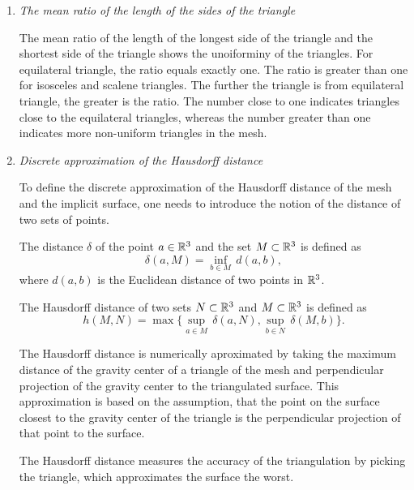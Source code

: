 \begin{enumerate}
    \item \textit{The mean ratio of the length of the sides of the triangle}
    
    The mean ratio of the length of the longest side of the triangle
    and the shortest side of the triangle shows the unoiforminy of the 
    triangles. 
    For equilateral triangle, the ratio equals exactly one. The ratio is
    greater than one for isosceles and scalene triangles. 
    The further the triangle is from equilateral triangle, the greater is the ratio.
    The number close to one indicates triangles close to the equilateral triangles,
    whereas the number greater than one indicates more non-uniform triangles in the mesh.

    \item \textit{Discrete approximation of the Hausdorff distance}
    
    To define the discrete approximation of the Hausdorff distance of the mesh and
    the implicit surface, one needs to introduce the notion of the distance of two sets
    of points.
\begin{definition} The distance $\delta$ of the point $a\in \mathbb{R}^3$ and the set
    $M \subset \mathbb{R}^3$ is defined as 
    \begin{equation}
        \delta(a, M) = \inf_{b \in M} \, d(a, b),
    \end{equation}
    where $d(a, b)$ is the Euclidean distance of two points in $\mathbb{R}^3$. 
\end{definition}
\begin{definition} The Hausdorff distance of two sets $N \subset \mathbb{R}^3$ and
    $M \subset \mathbb{R}^3$ is defined as
    \begin{equation}
        h(M, N) = \max \big \{\sup_{a \in M} \, \delta(a, N), \sup_{b \in N} \, \delta(M, b) \big \}.
    \end{equation}
\end{definition}
    The Hausdorff distance is numerically aproximated by taking the maximum distance
    of the gravity center of a triangle of the mesh and perpendicular projection of
    the gravity center to the triangulated surface.
    This approximation is based on the assumption, that the point on the surface
    closest to the gravity center of the triangle is the perpendicular projection of
    that point to the surface.

    The Hausdorff distance measures the accuracy of the triangulation by picking the 
    triangle, which approximates the surface the worst.


\end{enumerate}
